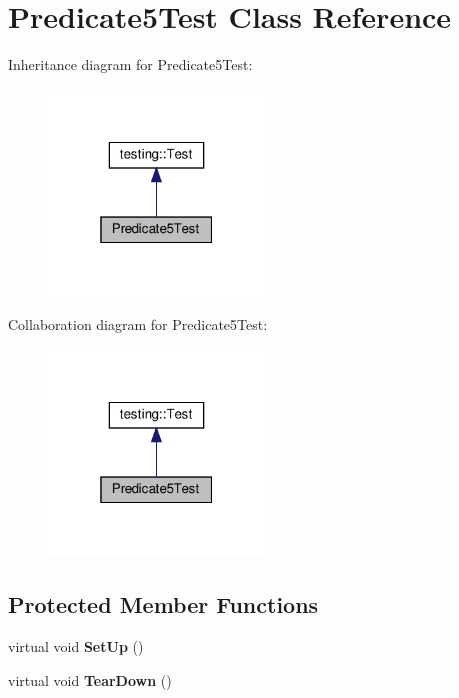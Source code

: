 \hypertarget{class_predicate5_test}{}\section{Predicate5\+Test Class Reference}
\label{class_predicate5_test}


Inheritance diagram for Predicate5\+Test\+:
\nopagebreak
\begin{figure}[H]
\begin{center}
\leavevmode
\includegraphics[width=163pt]{class_predicate5_test__inherit__graph}
\end{center}
\end{figure}


Collaboration diagram for Predicate5\+Test\+:
\nopagebreak
\begin{figure}[H]
\begin{center}
\leavevmode
\includegraphics[width=163pt]{class_predicate5_test__coll__graph}
\end{center}
\end{figure}
\subsection*{Protected Member Functions}
\begin{DoxyCompactItemize}
\item 
\mbox{\label{class_predicate5_test_a42bf622b4f2134d0497cd42fd2e3e1df}} 
virtual void {\bfseries Set\+Up} ()
\item 
\mbox{\label{class_predicate5_test_ab7bc4521d96174d5ef96156edc15444d}} 
virtual void {\bfseries Tear\+Down} ()
\end{DoxyCompactItemize}
